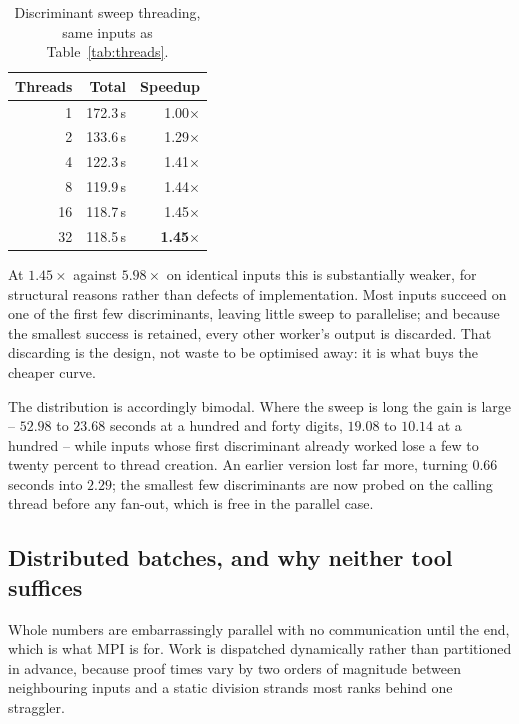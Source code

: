 \documentclass[11pt,a4paper]{article}
\begin{document}
\begin{table}[t]
\centering
\begin{tabular}{rrr}
\toprule
Threads & Total & Speedup \\
\midrule
1  & 172.3\,s & 1.00$\times$ \\
2  & 133.6\,s & 1.29$\times$ \\
4  & 122.3\,s & 1.41$\times$ \\
8  & 119.9\,s & 1.44$\times$ \\
16 & 118.7\,s & 1.45$\times$ \\
32 & 118.5\,s & \textbf{1.45$\times$} \\
\bottomrule
\end{tabular}
\caption{Discriminant sweep threading, same inputs as
  Table~\ref{tab:threads}.}
\label{tab:sweep}
\end{table}

At $1.45\times$ against $5.98\times$ on identical inputs this is
substantially weaker, for structural reasons rather than defects of
implementation. Most inputs succeed on one of the first few
discriminants, leaving little sweep to parallelise; and because the
smallest success is retained, every other worker's output is discarded.
That discarding is the design, not waste to be optimised away: it is what
buys the cheaper curve.

The distribution is accordingly bimodal. Where the sweep is long the gain
is large -- $52.98$ to $23.68$ seconds at a hundred and forty digits,
$19.08$ to $10.14$ at a hundred -- while inputs whose first discriminant
already worked lose a few to twenty percent to thread creation. An
earlier version lost far more, turning $0.66$ seconds into $2.29$; the
smallest few discriminants are now probed on the calling thread before
any fan-out, which is free in the parallel case.

\subsection{Distributed batches, and why neither tool suffices}

Whole numbers are embarrassingly parallel with no communication until the
end, which is what MPI is for. Work is dispatched dynamically rather than
partitioned in advance, because proof times vary by two orders of
magnitude between neighbouring inputs and a static division strands most
ranks behind one straggler.
\end{document}
